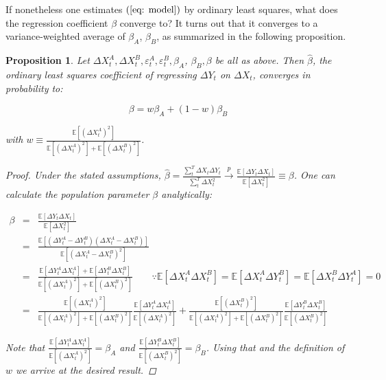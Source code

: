 \documentclass{article}
\theoremstyle{lemma}
\newtheorem{proposition}{Proposition}
\begin{document}
If nonetheless one estimates $(\ref{eq: model})$ by ordinary least squares, what does the regression coefficient $\beta$ converge to? It turns out that it converges to a variance-weighted average of $\beta_A$, $\beta_B$, as summarized in the following proposition.

\begin{proposition} Let $\Delta X_t^A, \Delta X_t^B, \varepsilon_t^A, \varepsilon_t^B, \beta_A$, $\beta_B, \beta$ be all as above. Then $\hat{\beta}$, the ordinary least squares coefficient of regressing $\Delta Y_t$ on $\Delta X_t$, converges in probability to:

\begin{equation}\label{eq: plim}
    \beta = w \beta_A + (1-w) \beta_B
\end{equation}

\noindent with $w \equiv \frac{\mathbb{E}[(\Delta X_t^A)^2]}{\mathbb{E}[(\Delta X_t^A)^2] + \mathbb{E}[(\Delta X_t^B) ^2] }$. 

\begin{proof}
    Under the stated assumptions, $\hat{\beta} = \frac{\sum_{t}^T \Delta X_t \Delta Y_t}{\sum_{t}^T \Delta X_t^2} \xrightarrow{p} \frac{ \mathbb{E}[\Delta Y_t \Delta X_t] }{\mathbb{E}[\Delta X_t^2] } \equiv \beta$. One can calculate the population parameter $\beta$ analytically:

\begin{eqnarray*}
    \beta &=& \frac{ \mathbb{E}[\Delta Y_t \Delta X_t] }{\mathbb{E}[\Delta X_t^2] }  \\
    &=& \frac{ \mathbb{E}[ ( \Delta Y_t^A - \Delta Y_t^B)( \Delta X_t^A - \Delta X_t^B)] }{\mathbb{E}[( \Delta X_t^A - \Delta X_t^B)^2] }  \\
    &=& \frac{ \mathbb{E}[ \Delta Y_t^A \Delta X_t^A] + \mathbb{E}[ \Delta Y_t^B \Delta X_t^B] }{\mathbb{E}[(\Delta X_t^A)^2] + \mathbb{E}[(\Delta X_t^B) ^2] } \qquad   \because \mathbb{E}[\Delta X_t^A \Delta X_t^B] = \mathbb{E}[\Delta X_t^A \Delta Y_t^B] = \mathbb{E}[\Delta X_t^B \Delta Y_t^A] = 0  \\
    &=& \frac{\mathbb{E}[(\Delta X_t^A)^2]}{\mathbb{E}[(\Delta X_t^A)^2] + \mathbb{E}[(\Delta X_t^B) ^2] } \frac{ \mathbb{E}[ \Delta Y_t^A \Delta X_t^A]}{ \mathbb{E}[(\Delta X_t^A)^2] } + \frac{\mathbb{E}[(\Delta X_t^B)^2]}{\mathbb{E}[(\Delta X_t^A)^2] + \mathbb{E}[(\Delta X_t^B) ^2] } \frac{\mathbb{E}[ \Delta Y_t^B \Delta X_t^B]}{ \mathbb{E}[(\Delta X_t^B)^2]} 
\end{eqnarray*}

Note that $\frac{ \mathbb{E}[ \Delta Y_t^A \Delta X_t^A]}{ \mathbb{E}[(\Delta X_t^A)^2] } = \beta_A$ and $\frac{ \mathbb{E}[ \Delta Y_t^B \Delta X_t^B]}{ \mathbb{E}[(\Delta X_t^B)^2] } =  \beta_B$. Using that and the definition of $w$ we arrive at the desired result.
\end{proof}

\end{proposition}
\end{document}
